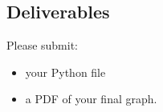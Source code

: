 \begin{fullwidth}
\section{Deliverables}

Please submit:

\begin{itemize}
\item your Python file
\item a PDF of your final graph.
\end{itemize}

\end{fullwidth}

